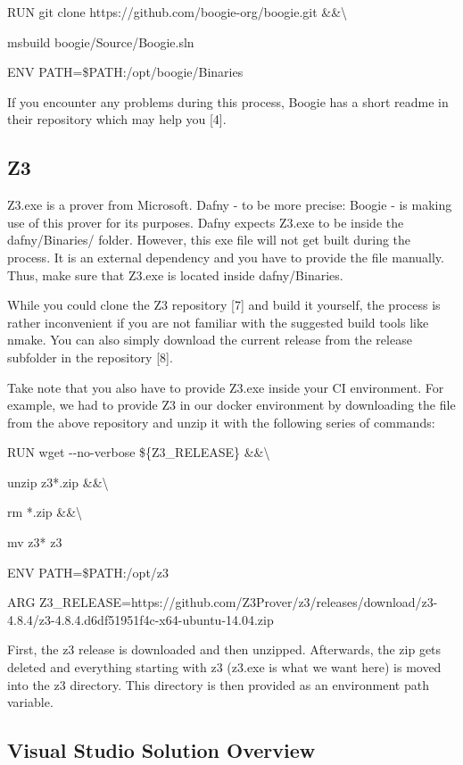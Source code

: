 \documentclass[]{book}
\begin{document}
RUN git clone https://github.com/boogie-org/boogie.git \&\&\textbackslash{}

msbuild boogie/Source/Boogie.sln

ENV PATH=\$PATH:/opt/boogie/Binaries

If you encounter any problems during this process, Boogie has a short readme in their repository which may help you {[}4{]}.

\subsection{Z3}\label{z3}

Z3.exe is a prover from Microsoft. Dafny - to be more precise: Boogie - is making use of this prover for its purposes. Dafny expects Z3.exe to be inside the dafny/Binaries/ folder. However, this exe file will not get built during the process. It is an external dependency and you have to provide the file manually. Thus, make sure that Z3.exe is located inside dafny/Binaries.

While you could clone the Z3 repository {[}7{]} and build it yourself, the process is rather inconvenient if you are not familiar with the suggested build tools like nmake. You can also simply download the current release from the release subfolder in the repository {[}8{]}.

Take note that you also have to provide Z3.exe inside your CI environment. For example, we had to provide Z3 in our docker environment by downloading the file from the above repository and unzip it with the following series of commands:

RUN wget -\/-no-verbose \$\{Z3\_RELEASE\} \&\&\textbackslash{}

unzip z3*.zip \&\&\textbackslash{}

rm *.zip \&\&\textbackslash{}

mv z3* z3

ENV PATH=\$PATH:/opt/z3

ARG Z3\_RELEASE=https://github.com/Z3Prover/z3/releases/download/z3-4.8.4/z3-4.8.4.d6df51951f4c-x64-ubuntu-14.04.zip

First, the z3 release is downloaded and then unzipped. Afterwards, the zip gets deleted and everything starting with z3 (z3.exe is what we want here) is moved into the z3 directory. This directory is then provided as an environment path variable.

\subsection{Visual Studio Solution Overview}\label{visual-studio-solution-overview}
\end{document}
